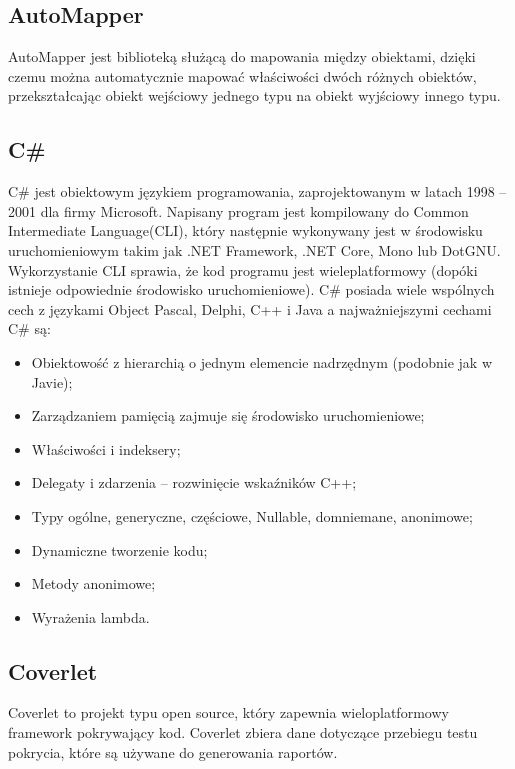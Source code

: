 \documentclass[12pt,a4paper]{article}
\begin{document}
		\subsection{AutoMapper}
			\indent AutoMapper jest biblioteką służącą do mapowania między obiektami, dzięki czemu można automatycznie mapować właściwości dwóch różnych obiektów,
					przekształcając obiekt wejściowy jednego typu na obiekt wyjściowy innego typu.  
		\subsection{C\#}
			\indent C\# jest obiektowym językiem programowania, zaprojektowanym w latach 1998 – 2001 dla firmy Microsoft.
			Napisany program jest kompilowany do Common Intermediate Language(CLI), który następnie wykonywany jest w środowisku uruchomieniowym takim jak .NET Framework,
			.NET Core, Mono lub DotGNU.
			Wykorzystanie CLI sprawia, że kod programu jest wieleplatformowy (dopóki istnieje odpowiednie środowisko uruchomieniowe).
			C\# posiada wiele wspólnych cech z językami Object Pascal, Delphi, C++ i Java a najważniejszymi cechami C\# są:
			\begin{itemize}
				\item Obiektowość z hierarchią o jednym elemencie nadrzędnym (podobnie jak w Javie);
				\item Zarządzaniem pamięcią zajmuje się środowisko uruchomieniowe;
				\item Właściwości i indeksery;
				\item Delegaty i zdarzenia – rozwinięcie wskaźników C++;
				\item Typy ogólne, generyczne, częściowe, Nullable, domniemane, anonimowe;
				\item Dynamiczne tworzenie kodu;
				\item Metody anonimowe;
				\item Wyrażenia lambda.
			\end{itemize}
		
		\subsection{Coverlet}
			\indent Coverlet to projekt typu open source, który zapewnia wieloplatformowy framework
			pokrywający kod. Coverlet zbiera dane dotyczące przebiegu testu pokrycia,
			które są używane do generowania raportów.
\end{document}
